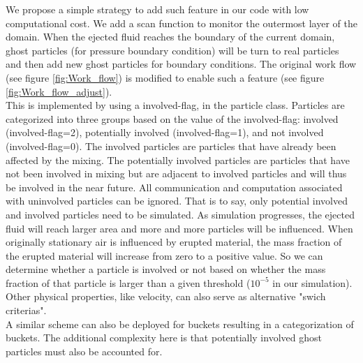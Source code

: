 \documentclass[conference,compsoc]{IEEEtran}
\begin{document}
We propose a simple strategy to add such feature in our code with low computational cost. We add a scan function to monitor the outermost layer of the domain. When the ejected fluid reaches the boundary of the current domain, ghost particles (for pressure boundary condition) will be turn to real particles and then add new ghost particles for boundary conditions. The original work flow (see figure \ref{fig:Work_flow}) is modified to enable such a feature (see figure \ref{fig:Work_flow_adjust}).\\
This is implemented by using a involved-flag, in the particle class. Particles are categorized into three groups based on the value of the involved-flag: involved (involved-flag=2), potentially involved (involved-flag=1), and not involved (involved-flag=0). The involved particles are particles that have already been affected by the mixing. The potentially involved particles are particles that have not been involved in mixing but are adjacent to involved particles and will thus be involved in the near future. 
All communication and computation associated with uninvolved particles can be ignored. That is to say, only potential involved and involved particles need to be simulated.
As simulation progresses, the ejected fluid will reach larger area and more and more particles will be influenced. When originally stationary air is influenced by erupted material, the mass fraction of the erupted material will increase from zero to a positive value. So we can determine whether a particle is involved or not based on whether the mass fraction of that particle is larger than a given threshold ($10^{-5} $ in our simulation). Other physical properties, like velocity, can also serve as alternative "swich criterias".\\
A similar scheme can also be deployed for buckets resulting in a categorization  of buckets. The additional complexity here is that potentially involved ghost particles must also be accounted for.
\end{document}
